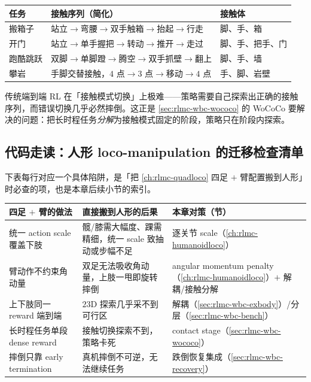 \begin{center}
\small
\begin{tabular}{lll}
\hline
任务 & 接触序列（简化） & 接触体 \\
\hline
搬箱子 & 站立$\to$弯腰$\to$双手触箱$\to$抬起$\to$行走 & 脚、手、箱 \\
开门 & 站立$\to$单手握把$\to$转动$\to$推开$\to$走过 & 脚、手、把手、门 \\
跑酷跳跃 & 双脚$\to$单脚蹬$\to$腾空$\to$双手抓壁$\to$翻上 & 脚、手、墙 \\
攀岩 & 手脚交替接触，$4$ 点$\to$$3$ 点$\to$移动$\to$$4$ 点 & 手、脚、岩壁 \\
\hline
\end{tabular}
\end{center}

传统端到端 RL 在「接触模式切换」上极难——策略需要自己探索出正确的接触序列，而错误切换几乎必然摔倒。这正是 \cref{sec:rlmc-wbc-wococo} 的 WoCoCo 要解决的问题：把长时程任务\emph{分解}为接触模式固定的阶段，策略只在阶段内探索。

\subsection{代码走读：人形 loco-manipulation 的迁移检查清单}
下表每行对应一个具体陷阱，是「把 \cref{ch:rlmc-quadloco} 四足 $+$ 臂配置搬到人形」时必查的项，也是本章后续小节的索引。

\begin{center}
\small
\begin{tabular}{p{3.3cm}p{4.6cm}p{4.6cm}}
\hline
四足 $+$ 臂的做法 & 直接搬到人形的后果 & 本章对策（节） \\
\hline
统一 action scale 覆盖下肢 & 髋/膝需大幅度、踝需精细，统一 scale 致抽动或步幅不足 & 逐关节 scale（\cref{ch:rlmc-humanoidloco}） \\
臂动作不约束角动量 & 双足无法吸收角动量，上肢一甩即旋转摔倒 & angular momentum penalty（\cref{ch:rlmc-humanoidloco}）$+$ 解耦/接触分解 \\
上下肢同一 reward 端到端 & $23$D 探索几乎采不到可行区 & 解耦（\cref{sec:rlmc-wbc-exbody}）/分层（\cref{sec:rlmc-wbc-bench}） \\
长时程任务单段 dense reward & 接触切换探索不到，策略卡死 & contact stage（\cref{sec:rlmc-wbc-wococo}） \\
摔倒只靠 early termination & 真机摔倒不可逆，无法继续任务 & 跌倒恢复集成（\cref{sec:rlmc-wbc-recovery}） \\
\hline
\end{tabular}
\end{center}

